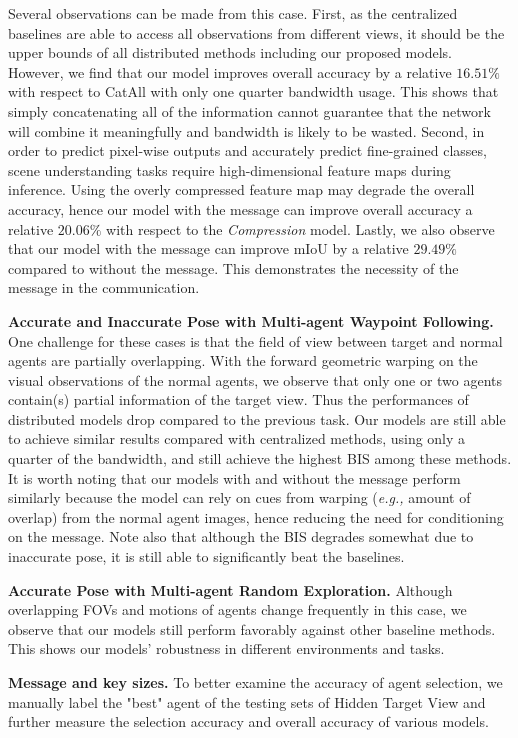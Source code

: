 Several observations can be made from this case.
First, as the centralized baselines are able to access all observations from different views, it should be the upper bounds of all distributed methods including our proposed models. However, we find that our model improves overall accuracy by a relative \textit{$16.51\%$} with respect to CatAll with only one quarter bandwidth usage. This shows that simply concatenating all of the information cannot guarantee that the network will combine it meaningfully and bandwidth is likely to be wasted. Second, in order to predict pixel-wise outputs and accurately predict fine-grained classes, scene understanding tasks require high-dimensional feature maps during inference. Using the overly compressed feature map may degrade the overall accuracy, hence our model with the message can improve overall accuracy a relative $20.06\%$ with respect to the \textit{Compression} model. Lastly, we also observe that our model with the message can improve mIoU by a relative $29.49\%$ compared to without the message. This demonstrates the necessity of the message in the communication.

\textbf{Accurate and Inaccurate Pose with Multi-agent Waypoint Following.}
One challenge for these cases is that the field of view between target and normal agents are partially overlapping. With the forward geometric warping on the visual observations of the normal agents, we observe that only one or two agents contain(s) partial information of the target view. Thus the performances of distributed models drop compared to the previous task. Our models are still able to achieve similar results compared with centralized methods, using only a quarter of the bandwidth, and still achieve the highest BIS among these methods. 
It is worth noting that our models with and without the message perform similarly because the model can rely on cues from warping (\textit{e.g.,} amount of overlap) from the normal agent images, hence reducing the need for conditioning on the message. Note also that although the BIS degrades somewhat due to inaccurate pose, it is still able to significantly beat the baselines.

\textbf{Accurate Pose with Multi-agent Random Exploration.}
Although overlapping FOVs and motions of agents change frequently in this case, we observe that our models still perform favorably against other baseline methods. This shows our models' robustness in different environments and tasks. 

\textbf{Message and key sizes.} 
To better examine the accuracy of agent selection, we manually label the "best" agent of the testing sets of Hidden Target View 
and further measure the selection accuracy and overall accuracy of various models. 

